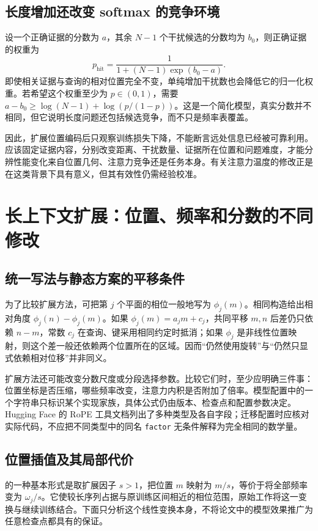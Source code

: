 \documentclass[UTF8,12pt,a4paper,fontset=fandol]{ctexart}
\begin{document}
\subsection{长度增加还改变 softmax 的竞争环境}
设一个正确证据的分数为 $a$，其余 $N-1$ 个干扰候选的分数均为 $b_0$，则正确证据的权重为
\begin{equation}
p_{\mathrm{hit}}=\frac{1}{1+(N-1)\exp(b_0-a)}.
\label{eq:rope-distractor}
\end{equation}
即使相关证据与查询的相对位置完全不变，单纯增加干扰数也会降低它的归一化权重。若希望这个权重至少为 $p\in(0,1)$，需要 $a-b_0\geq\log(N-1)+\log(p/(1-p))$。这是一个简化模型，真实分数并不相同，但它说明长度问题还包括候选竞争，而不只是频率表覆盖。

因此，扩展位置编码后只观察训练损失下降，不能断言远处信息已经被可靠利用。应该固定证据内容，分别改变距离、干扰数量、证据所在位置和问题难度，才能分辨性能变化来自位置几何、注意力竞争还是任务本身。有关注意力温度的修改正是在这类背景下具有意义，但其有效性仍需经验校准。

\section{长上下文扩展：位置、频率和分数的不同修改}
\label{sec:rope-scaling}

\subsection{统一写法与静态方案的平移条件}
为了比较扩展方法，可把第 $j$ 个平面的相位一般地写为 $\phi_j(m)$。相同构造给出相对角度 $\phi_j(n)-\phi_j(m)$。如果 $\phi_j(m)=a_jm+c_j$，共同平移 $m,n$ 后差仍只依赖 $n-m$，常数 $c_j$ 在查询、键采用相同约定时抵消；如果 $\phi_j$ 是非线性位置映射，则这个差一般还依赖两个位置所在的区域。因而“仍然使用旋转”与“仍然只显式依赖相对位移”并非同义。

扩展方法还可能改变分数尺度或分段选择参数。比较它们时，至少应明确三件事：位置坐标是否压缩，哪些频率改变，注意力内积是否附加了倍率。模型配置中的一个字符串只标识某个实现家族，具体公式仍由版本、检查点和配置参数决定。Hugging Face 的 RoPE 工具文档列出了多种类型及各自字段\cite{hf-rope}；迁移配置时应核对实际代码，不应把不同类型中的同名 \texttt{factor} 无条件解释为完全相同的数学量。

\subsection{位置插值及其局部代价}
的一种基本形式是取扩展因子 $s>1$，把位置 $m$ 映射为 $m/s$，等价于将全部频率变为 $\omega_j/s$。它使较长序列占据与原训练区间相近的相位范围，原始工作将这一变换与继续训练结合\cite{chen2023}。下面只分析这个线性变换本身，不将论文中的模型效果推广为任意检查点都具有的保证。
\end{document}
